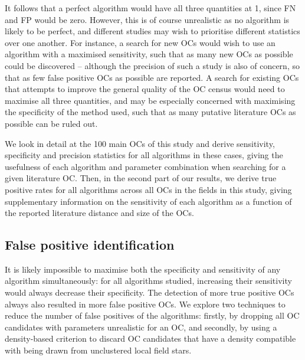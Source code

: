 \noindent
{} It follows that a perfect algorithm would have all three quantities at 1, since FN and FP would be zero. However, this is of course unrealistic as no algorithm is likely to be perfect, and different studies may wish to prioritise different statistics over one another. For instance, a search for new OCs would wish to use an algorithm with a maximised sensitivity, such that as many new OCs as possible could be discovered -- although the precision of such a study is also of concern, so that as few false positive OCs as possible are reported. A search for existing OCs that attempts to improve the general quality of the OC census would need to maximise all three quantities, and may be especially concerned with maximising the specificity of the method used, such that as many putative literature OCs as possible can be ruled out.

We look in detail at the 100 main OCs of this study and derive sensitivity, specificity and precision statistics for all algorithms in these cases, giving the usefulness of each algorithm and parameter combination when searching for a given literature OC. Then, in the second part of our results, we derive true positive rates for all algorithms across all OCs in the fields in this study, giving supplementary information on the sensitivity of each algorithm as a function of the reported literature distance and size of the OCs.


\subsection{False positive identification}\label{c2:sec:false_positives}

It is likely impossible to maximise both the specificity and sensitivity of any algorithm simultaneously: for all algorithms studied, increasing their sensitivity would always decrease their specificity. The detection of more true positive OCs always also resulted in more false positive OCs. We explore two techniques to reduce the number of false positives of the algorithms: firstly, by dropping all OC candidates with parameters unrealistic for an OC, and secondly, by using a density-based criterion to discard OC candidates that have a density compatible with being drawn from unclustered local field stars.

